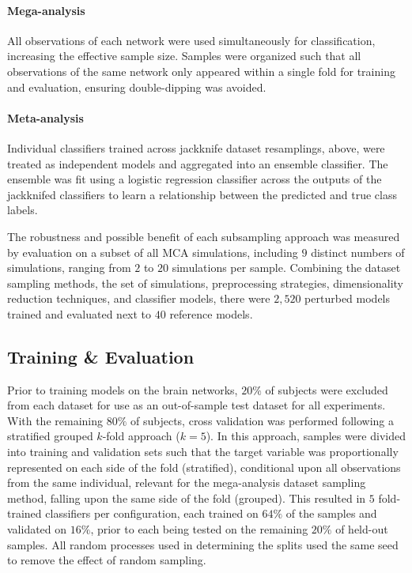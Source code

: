 \documentclass[num-refs]{nbdt-article}
\begin{document}
\paragraph{Mega-analysis} All observations of each network were used simultaneously for classification, increasing the effective sample size. Samples were organized such that all observations of the same network only appeared within a single fold for training and evaluation, ensuring double-dipping was avoided.

\paragraph{Meta-analysis} Individual classifiers trained across jackknife dataset resamplings, above, were treated as independent models and aggregated into an ensemble classifier. The ensemble was fit using a logistic regression classifier across the outputs of the jackknifed classifiers to learn a relationship between the predicted and true class labels.

The robustness and possible benefit of each subsampling approach was measured by evaluation on a subset of all MCA simulations, including $9$ distinct numbers of simulations, ranging from $2$ to $20$ simulations per sample. Combining the dataset sampling methods, the set of simulations, preprocessing strategies, dimensionality reduction techniques, and classifier models, there were $2,520$ perturbed models trained and evaluated next to $40$ reference models.

\subsection{Training \& Evaluation}

Prior to training models on the brain networks, $20\%$ of subjects were excluded from each dataset for use as an out-of-sample test dataset for all experiments. With the remaining $80\%$ of subjects, cross validation was performed following a stratified grouped $k$-fold approach ($k=5$). In this approach, samples were divided into training and validation sets such that the target variable was proportionally represented on each side of the fold (stratified), conditional upon all observations from the same individual, relevant for the mega-analysis dataset sampling method, falling upon the same side of the fold (grouped). This resulted in $5$ fold-trained classifiers per configuration, each trained on $64\%$ of the samples and validated on $16\%$, prior to each being tested on the remaining $20\%$ of held-out samples. All random processes used in determining the splits used the same seed to remove the effect of random sampling.
\end{document}

